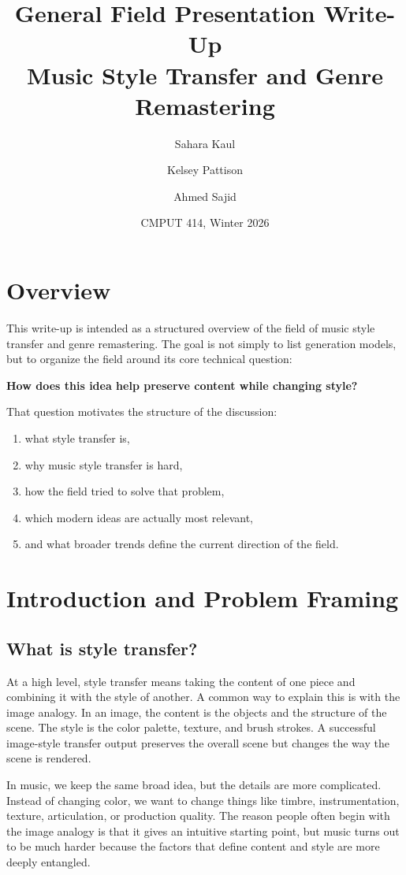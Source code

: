 \documentclass[11pt]{article}
\title{General Field Presentation Write-Up\\Music Style Transfer and Genre Remastering}
\author{Sahara Kaul \and Kelsey Pattison \and Ahmed Sajid}
\date{CMPUT 414, Winter 2026}
\begin{document}
\color{Ink}
\maketitle
\tableofcontents
\newpage

\section{Overview}

This write-up is intended as a structured overview of the field of music style transfer and genre remastering. The goal is not simply to list generation models, but to organize the field around its core technical question:

\begin{center}
\textbf{How does this idea help preserve content while changing style?}
\end{center}

That question motivates the structure of the discussion:

\begin{enumerate}
\item what style transfer is,
\item why music style transfer is hard,
\item how the field tried to solve that problem,
\item which modern ideas are actually most relevant,
\item and what broader trends define the current direction of the field.
\end{enumerate}

\section{Introduction and Problem Framing}

\subsection{What is style transfer?}

At a high level, style transfer means taking the content of one piece and combining it with the style of another. A common way to explain this is with the image analogy. In an image, the content is the objects and the structure of the scene. The style is the color palette, texture, and brush strokes. A successful image-style transfer output preserves the overall scene but changes the way the scene is rendered.

In music, we keep the same broad idea, but the details are more complicated. Instead of changing color, we want to change things like timbre, instrumentation, texture, articulation, or production quality. The reason people often begin with the image analogy is that it gives an intuitive starting point, but music turns out to be much harder because the factors that define content and style are more deeply entangled.
\end{document}
